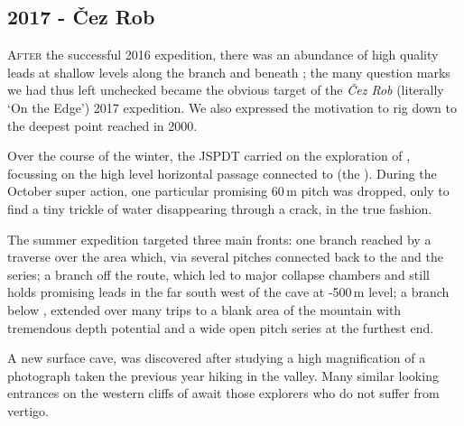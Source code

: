 \newpage
  
\begin{tcolorbox}

\chapter{2017 - Čez Rob}
	
	\lettrine{A}{fter} the successful 2016 expedition, there was an abundance of high quality leads at shallow levels along the  branch and beneath ; the many question marks we had thus left unchecked became the obvious target of the \emph{ Čez Rob} (literally `On the Edge') 2017 expedition. We also expressed the motivation to rig down to the deepest point reached in 2000.

	Over the course of the winter, the JSPDT carried on the exploration of , focussing on the high level horizontal passage connected to  (the ). During the October super action, one particular promising 60\,m pitch was dropped, only to find a tiny trickle of water disappearing through a crack, in the true  fashion.

	The summer expedition targeted three main fronts: one branch reached by a traverse over the  area which, via several pitches connected back to the  and the  series; a branch off the  route, which led to major collapse chambers and still holds promising leads in the far south west of the cave at -500\,m level; a branch below , extended over many trips to a blank area of the mountain with tremendous depth potential and a wide open pitch series at the furthest end.

	A new surface cave,  was discovered after studying a high magnification of a photograph taken the previous year hiking in the  valley. Many similar looking entrances on the western cliffs of  await those explorers who do not suffer from vertigo.

\end{tcolorbox}

